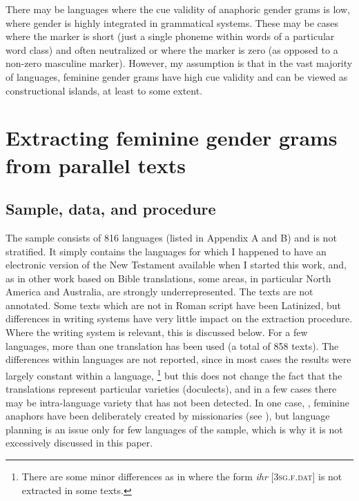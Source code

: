 \documentclass[output=collectionpaper]{langsci/langscibook}
\begin{document}
\newpage 
There may be languages where the cue validity of anaphoric gender grams is low, where gender is highly integrated in grammatical systems. These may be cases where the marker is short (just a single phoneme within words of a particular word class) and often neutralized or where the marker is zero (as opposed to a non-zero masculine marker). However, my assumption is that in the vast majority of languages, feminine gender grams have high cue validity and can be viewed as constructional islands, at least to some extent.


\section{Extracting feminine gender grams from parallel texts}
\label{sec:BW:3}

\subsection{Sample, data, and procedure}
\label{sec:BW:3.1}

The sample consists of 816 languages (listed in Appendix A and B) and is not stratified. It simply contains the languages for which I happened to have an electronic version of the New Testament available when I started this work, and, as in other work based on Bible translations, some areas, in particular North America and Australia, are strongly underrepresented. The texts are not annotated. Some texts which are not in Roman script have been Latinized, but differences in writing systems have very little impact on the extraction procedure. Where the writing system is relevant, this is discussed below. For a few languages, more than one translation has been used (a total of 858 texts). The differences within languages are not reported, since in most cases the results were largely constant within a language,%
\footnote{%
There are some minor differences as in  where the form \textit{ihr} [\textsc{3sg.f.dat}] is not extracted in some texts.
} %
but this does not change the fact that the translations represent particular varieties (doculects), and in a few cases there may be intra-language variety that has not been detected. In one case, , feminine anaphors have been deliberately created by missionaries (see ), but language planning is an issue only for few languages of the sample, which is why it is not excessively discussed in this paper.
\end{document}
